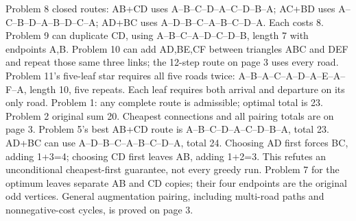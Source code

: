 \documentclass[11pt]{article}
\begin{document}
Problem 8 closed routes: AB+CD uses A--B--C--D--A--C--D--B--A; AC+BD uses A--C--B--D--A--B--D--C--A; AD+BC uses A--D--B--C--A--B--C--D--A. Each costs 8. Problem 9 can duplicate CD, using A--B--C--A--D--C--D--B, length 7 with endpoints A,B. Problem 10 can add AD,BE,CF between triangles ABC and DEF and repeat those same three links; the 12-step route on page 3 uses every road. Problem 11's five-leaf star requires all five roads twice: A--B--A--C--A--D--A--E--A--F--A, length 10, five repeats. Each leaf requires both arrival and departure on its only road.
Problem 1: any complete route is admissible; optimal total is 23. Problem 2 original sum 20. Cheapest connections and all pairing totals are on page 3. Problem 5's best AB+CD route is A--B--C--D--A--C--D--B--A, total 23. AD+BC can use A--D--B--C--A--B--C--D--A, total 24. Choosing AD first forces BC, adding 1+3=4; choosing CD first leaves AB, adding 1+2=3. This refutes an unconditional cheapest-first guarantee, not every greedy run. Problem 7 for the optimum leaves separate AB and CD copies; their four endpoints are the original odd vertices. General augmentation pairing, including multi-road paths and nonnegative-cost cycles, is proved on page 3.
\end{document}
